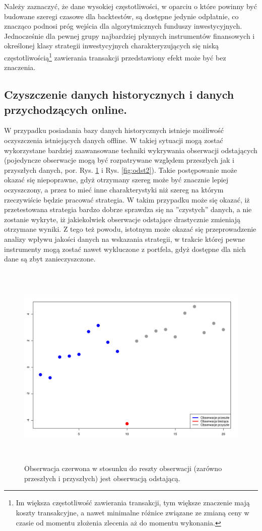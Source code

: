 \documentclass[a4paper,12pt,openany, DIV=calc, headsepline]{scrbook}
\begin{document}
Należy zaznaczyć, że dane wysokiej częstotliwości, w oparciu o które powinny być budowane szeregi czasowe dla backtestów, są dostępne jedynie odpłatnie, co znacząco podnosi próg wejścia dla algorytmicznych funduszy inwestycyjnych. Jednocześnie dla pewnej grupy najbardziej płynnych instrumentów finansowych i określonej klasy strategii inwestycyjnych charakteryzujących się niską częstotliwością\footnote{Im większa częstotliwość zawierania transakcji, tym większe znaczenie mają koszty transakcyjne, a nawet minimalne różnice związane ze zmianą ceny w czasie od momentu złożenia zlecenia aż do momentu wykonania.} zawierania transakcji przedstawiony efekt może być bez znaczenia.

\subsection{Czyszczenie danych historycznych i danych przychodzących online.}

W przypadku posiadania bazy danych historycznych istnieje możliwość oczyszczenia istniejących danych offline. W takiej sytuacji mogą zostać wykorzystane bardziej zaawansowane techniki wykrywania obserwacji odstających (pojedyncze obserwacje mogą być rozpatrywane względem przeszłych jak i przyszłych danych, por. Rys. \ref{fig:odst1} i Rys. \ref{fig:odst2}). Takie postępowanie może okazać się niepoprawne, gdyż otrzymany szereg może być znacznie lepiej oczyszczony, a przez to mieć inne charakterystyki niż szereg na którym rzeczywiście będzie pracować strategia. W takim przypadku może się okazać, iż przetestowana strategia bardzo dobrze sprawdza się na ''czystych'' danych, a nie zostanie wykryte, iż jakiekolwiek obserwacje odstające drastycznie zmieniają otrzymane wyniki. Z tego też powodu, istotnym może okazać się przeprowadzenie analizy wpływu jakości danych na wskazania strategii, w trakcie której pewne instrumenty mogą zostać nawet wykluczone z portfela, gdyż dostępne dla nich dane są zbyt zanieczyszczone.  


\begin{figure}[H]
  \centering
  \includegraphics[width=170mm, height=100mm]{wykresy/odst1}
  \caption{Obserwacja czerwona w stosunku do reszty obserwacji (zarówno przeszłych i przyszłych) jest obserwacją odstającą.}
  \label{fig:odst1}
\end{figure}
\end{document}
